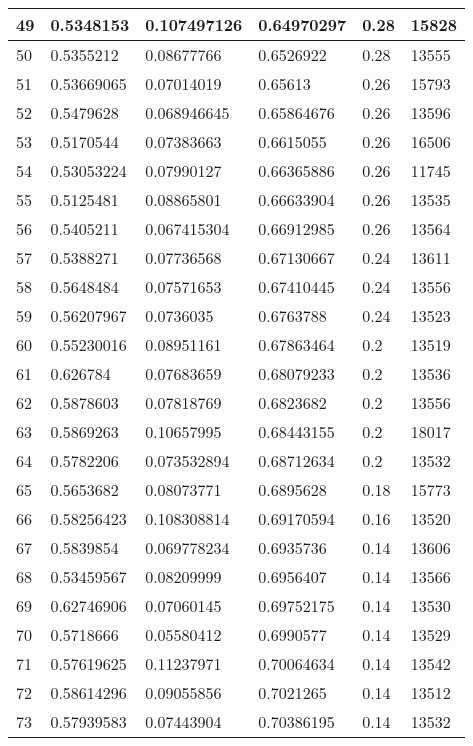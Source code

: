 \begin{longtable}{|l|l|l|l|l|l|}
49 & 0.5348153 & 0.107497126 & 0.64970297 & 0.28 & 15828 \\ \hline 
50 & 0.5355212 & 0.08677766 & 0.6526922 & 0.28 & 13555 \\ \hline 
51 & 0.53669065 & 0.07014019 & 0.65613 & 0.26 & 15793 \\ \hline 
52 & 0.5479628 & 0.068946645 & 0.65864676 & 0.26 & 13596 \\ \hline 
53 & 0.5170544 & 0.07383663 & 0.6615055 & 0.26 & 16506 \\ \hline 
54 & 0.53053224 & 0.07990127 & 0.66365886 & 0.26 & 11745 \\ \hline 
55 & 0.5125481 & 0.08865801 & 0.66633904 & 0.26 & 13535 \\ \hline 
56 & 0.5405211 & 0.067415304 & 0.66912985 & 0.26 & 13564 \\ \hline 
57 & 0.5388271 & 0.07736568 & 0.67130667 & 0.24 & 13611 \\ \hline 
58 & 0.5648484 & 0.07571653 & 0.67410445 & 0.24 & 13556 \\ \hline 
59 & 0.56207967 & 0.0736035 & 0.6763788 & 0.24 & 13523 \\ \hline 
60 & 0.55230016 & 0.08951161 & 0.67863464 & 0.2 & 13519 \\ \hline 
61 & 0.626784 & 0.07683659 & 0.68079233 & 0.2 & 13536 \\ \hline 
62 & 0.5878603 & 0.07818769 & 0.6823682 & 0.2 & 13556 \\ \hline 
63 & 0.5869263 & 0.10657995 & 0.68443155 & 0.2 & 18017 \\ \hline 
64 & 0.5782206 & 0.073532894 & 0.68712634 & 0.2 & 13532 \\ \hline 
65 & 0.5653682 & 0.08073771 & 0.6895628 & 0.18 & 15773 \\ \hline 
66 & 0.58256423 & 0.108308814 & 0.69170594 & 0.16 & 13520 \\ \hline 
67 & 0.5839854 & 0.069778234 & 0.6935736 & 0.14 & 13606 \\ \hline 
68 & 0.53459567 & 0.08209999 & 0.6956407 & 0.14 & 13566 \\ \hline 
69 & 0.62746906 & 0.07060145 & 0.69752175 & 0.14 & 13530 \\ \hline 
70 & 0.5718666 & 0.05580412 & 0.6990577 & 0.14 & 13529 \\ \hline 
71 & 0.57619625 & 0.11237971 & 0.70064634 & 0.14 & 13542 \\ \hline 
72 & 0.58614296 & 0.09055856 & 0.7021265 & 0.14 & 13512 \\ \hline 
73 & 0.57939583 & 0.07443904 & 0.70386195 & 0.14 & 13532 \\ \hline 

\end{longtable}

